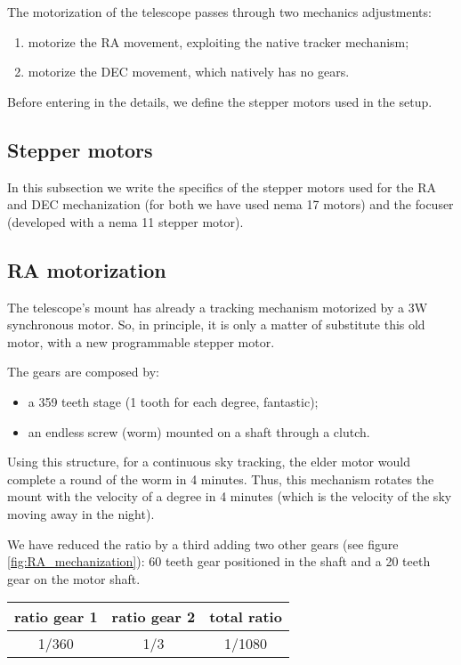 The motorization of the telescope passes through two mechanics adjustments:
\begin{enumerate}
    \item motorize the RA movement, exploiting the native tracker mechanism;
    \item motorize the DEC movement, which natively has no gears.
\end{enumerate}
Before entering in the details, we define the stepper motors used in the setup.

\subsection{Stepper motors}
In this subsection we write the specifics of the stepper motors used for the RA and DEC mechanization (for both we have used nema 17 motors) and the focuser (developed with a nema 11 stepper motor).

\subsection{RA motorization}
The telescope's mount has already a tracking mechanism motorized by a 3W synchronous motor.
So, in principle, it is only a matter of substitute this old motor, with a new programmable stepper motor.

The gears are composed by:
\begin{itemize}
    \item a 359 teeth stage (1 tooth for each degree, fantastic);
    \item an endless screw (worm) mounted on a shaft through a clutch.
\end{itemize}
Using this structure, for a continuous sky tracking, the elder motor would complete a round of the worm in 4 minutes.
Thus, this mechanism rotates the mount with the velocity of a degree in 4 minutes (which is the velocity of the sky moving away in the night).

We have reduced the ratio by a third adding two other gears (see figure \ref{fig:RA_mechanization}): 60 teeth gear positioned in the shaft and a 20 teeth gear on the motor shaft.
\\
\begin{minipage}{.4\textwidth}
    \centering
    \begin{tabular}{cc|c}
        ratio gear 1 & ratio gear 2 & total ratio \\
        \hline
        1/360 & 1/3 & 1/1080 \\
        \hline
    \end{tabular}
    \label{tab:RA_mechanization}
\end{minipage}
\\

